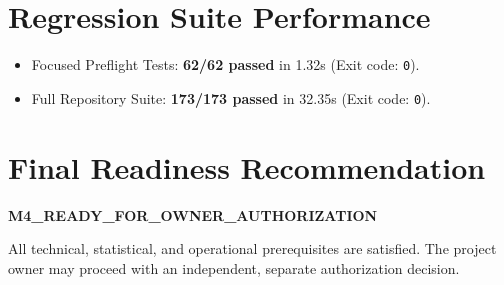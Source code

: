 \documentclass[10pt,a4paper]{article}
\begin{document}
\section{Regression Suite Performance}
\begin{itemize}
    \item Focused Preflight Tests: \textbf{62/62 passed} in 1.32s (Exit code: \texttt{0}).
    \item Full Repository Suite: \textbf{173/173 passed} in 32.35s (Exit code: \texttt{0}).
\end{itemize}

\section{Final Readiness Recommendation}

\begin{center}
{\Large \textbf{M4\_READY\_FOR\_OWNER\_AUTHORIZATION}}
\end{center}

\noindent All technical, statistical, and operational prerequisites are satisfied. The project owner may proceed with an independent, separate authorization decision.

\vspace{10pt}
\noindent{}
\end{document}
